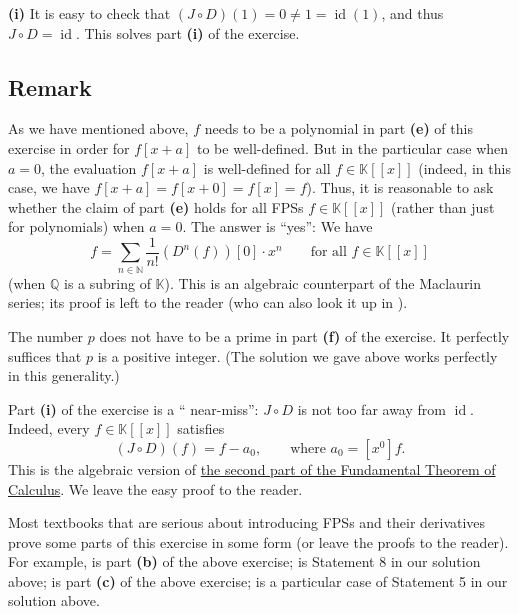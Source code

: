 \documentclass[paper=a4, fontsize=12pt]{scrartcl}%
\let\sumnonlimits\sum
\renewcommand{\sum}{\sumnonlimits\limits}
\theoremstyle{plainsl}
\theoremstyle{definition}
\theoremstyle{remark}
\begin{document}
\textbf{(i)} It is easy to check that $\left(  J\circ D\right)  \left(
1\right)  =0\neq1=\operatorname*{id}\left(  1\right)  $, and thus $J\circ
D=\operatorname*{id}$. This solves part \textbf{(i)} of the exercise.

\subsection{Remark}

As we have mentioned above, $f$ needs to be a polynomial in part \textbf{(e)}
of this exercise in order for $f\left[  x+a\right]  $ to be well-defined. But
in the particular case when $a=0$, the evaluation $f\left[  x+a\right]  $ is
well-defined for all $f\in\mathbb{K}\left[  \left[  x\right]  \right]  $
(indeed, in this case, we have $f\left[  x+a\right]  =f\left[  x+0\right]
=f\left[  x\right]  =f$). Thus, it is reasonable to ask whether the claim of
part \textbf{(e)} holds for all FPSs $f\in\mathbb{K}\left[  \left[  x\right]
\right]  $ (rather than just for polynomials) when $a=0$. The answer is
\textquotedblleft yes\textquotedblright: We have%
\[
f=\sum_{n\in\mathbb{N}}\dfrac{1}{n!}\left(  D^{n}\left(  f\right)  \right)
\left[  0\right]  \cdot x^{n}\qquad\text{for all }f\in\mathbb{K}\left[
\left[  x\right]  \right]
\]
(when $\mathbb{Q}$ is a subring of $\mathbb{K}$). This is an algebraic
counterpart of the Maclaurin series; its proof is left to the reader (who can
also look it up in \cite[Theorem 7.55]{Loehr-BC}).

\bigskip

The number $p$ does not have to be a prime in part \textbf{(f)} of the
exercise. It perfectly suffices that $p$ is a positive integer. (The solution
we gave above works perfectly in this generality.)

\bigskip

Part \textbf{(i)} of the exercise is a \textquotedblleft
near-miss\textquotedblright: $J\circ D$ is not too far away from
$\operatorname*{id}$. Indeed, every $f\in\mathbb{K}\left[  \left[  x\right]
\right]  $ satisfies%
\[
\left(  J\circ D\right)  \left(  f\right)  =f-a_{0},\qquad\text{where }%
a_{0}=\left[  x^{0}\right]  f.
\]
This is the algebraic version of
\href{https://en.wikipedia.org/wiki/Fundamental_theorem_of_calculus#Second_part}{the
second part of the Fundamental Theorem of Calculus}. We leave the easy proof
to the reader.

\bigskip

Most textbooks that are serious about introducing FPSs and their derivatives
prove some parts of this exercise in some form (or leave the proofs to the
reader). For example, \cite[Theorem 7.54 \textbf{(a)} and \textbf{(b)}%
]{Loehr-BC} is part \textbf{(b)} of the above exercise; \cite[Theorem 7.54
\textbf{(d)}]{Loehr-BC} is Statement 8 in our solution above; \cite[Theorem
7.54 \textbf{(e)}]{Loehr-BC} is part \textbf{(c)} of the above exercise;
\cite[Theorem 7.54 \textbf{(g)}]{Loehr-BC} is a particular case of Statement 5
in our solution above.
\end{document}
